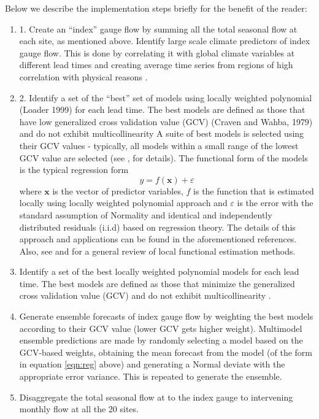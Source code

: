 \documentclass[final,5p,times,twocolumn,authoryear]{elsarticle}
\begin{document}
Below we describe the implementation steps briefly for the benefit of the reader: 
\begin{enumerate}

\item 1.	Create an ``index'' gauge flow by summing all the total seasonal flow at each site, as mentioned above. Identify large scale climate predictors of index gauge flow. This is done by correlating it with global climate variables at different lead times and creating average time series from regions of high correlation with physical reasons \citep{Grantz:2005ve,Bracken:2010cw}. 

\item 2.	Identify a set of the ``best'' set of models using  locally weighted polynomial (Loader 1999) for each lead time. The best models are defined as those that have low generalized cross validation value (GCV) (Craven and Wahba, 1979) and do not exhibit multicollinearity A suite of best models is selected using their GCV values - typically, all models within a small range of the lowest GCV value are selected (see \cite{Bracken:2010cw,Regonda2006}, for details). The functional form of the models is the typical regression form
\begin{equation}
y = f(\mathbf{x})+\varepsilon\label{eqn:reg}
\end{equation}
where $\mathbf{x}$ is the vector of predictor variables, $f$ is the function that is estimated locally using locally weighted polynomial approach and $\varepsilon$ is the error with the standard assumption of Normality and identical and independently distributed residuals (i.i.d) based on regression theory. The details of this approach and applications can be found in the aforementioned references. Also, see \cite{Rajagopalan:2010ur} and \cite{Lall:1995wk} for a general review of local functional estimation methods.

\item Identify a set of the best locally weighted polynomial models \cite{Loader:1999hx} for each lead time.  The best models are defined as those that minimize the generalized cross validation value (GCV) \citep{Craven1979} and do not exhibit multicollinearity \cite{Regonda2006}.

\item Generate ensemble forecasts of index gauge flow  by weighting the best models according to their GCV value (lower GCV gets higher weight).  Multimodel ensemble predictions are made by randomly selecting a model based on the GCV-based weights, obtaining the mean forecast from the model (of the form in equation \ref{eqn:reg} above) and generating a Normal deviate with the appropriate error variance.  This is repeated to generate the ensemble. 

\item Disaggregate the total seasonal flow at to the index gauge to  intervening monthly flow at all the 20 sites. 

\end{enumerate}
\end{document}
